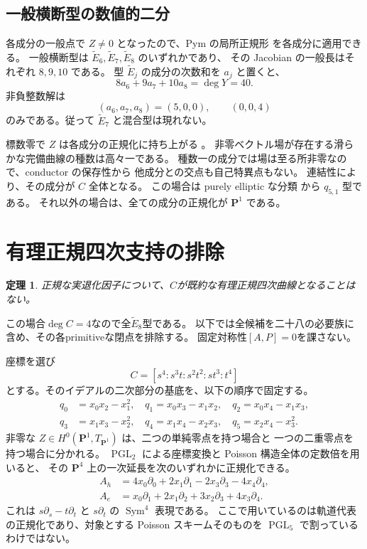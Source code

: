 \documentclass[11pt,a4paper]{ltjsarticle}
\newcommand{\PP}{\mathbf P}\renewcommand{\AA}{\mathbf A}
\newtheorem{theorem}{定理}[section]
\theoremstyle{remark}\newtheorem{remark}[theorem]{注意}
\begin{document}
\subsection{一般横断型の数値的二分}

各成分の一般点で $Z\ne0$ となったので、Pym の局所正規形
\cite[Theorem 4.5, Table 1]{PymElliptic}を各成分に適用できる。
一般横断型は $\widetilde E_6,\widetilde E_7,\widetilde E_8$ のいずれかであり、
その Jacobian の一般長はそれぞれ $8,9,10$ である。
型 $\widetilde E_j$ の成分の次数和を $a_j$ と置くと、
\[
8a_6+9a_7+10a_8=\deg Y=40.
\]
非負整数解は
\[
(a_6,a_7,a_8)=(5,0,0),\qquad (0,0,4)
\]
のみである。従って $\widetilde E_7$ と混合型は現れない。


標数零で $Z$ は各成分の正規化に持ち上がる \cite{Seidenberg}。
非零ベクトル場が存在する滑らかな完備曲線の種数は高々一である。
種数一の成分では場は至る所非零なので、conductor の保存性から
他成分との交点も自己特異点もない。
連結性により、その成分が $C$ 全体となる。
この場合は purely elliptic な分類 \cite[Theorem 1.3]{PymElliptic}から $q_{5,1}$ 型である。
それ以外の場合は、全ての成分の正規化が $\PP^1$ である。


\section{有理正規四次支持の排除}\label{sec:rnc4}
\begin{theorem}\label{thm:rnc4}
正規な実退化因子について、$C$が既約な有理正規四次曲線となることはない。
\end{theorem}
この場合$\deg C=4$なので全$\widetilde E_8$型である。
以下では全候補を二十八の必要族に含め、その各primitiveな閉点を排除する。
固定対称性$[A,P]=0$を課さない。


座標を選び
\[
 C=[s^4:s^3t:s^2t^2:st^3:t^4]
\]
とする。そのイデアルの二次部分の基底を、以下の順序で固定する。
\[
\begin{split}
 q_0&=x_0x_2-x_1^2,\quad q_1=x_0x_3-x_1x_2,\quad q_2=x_0x_4-x_1x_3,\\
 q_3&=x_1x_3-x_2^2,\quad q_4=x_1x_4-x_2x_3,\quad q_5=x_2x_4-x_3^2.
\end{split}
\]
非零な $Z\in H^0(\PP^1,T_{\PP^1})$ は、二つの単純零点を持つ場合と
一つの二重零点を持つ場合に分かれる。
$\operatorname{PGL}_2$ による座標変換と Poisson 構造全体の定数倍を用いると、
その $\PP^4$ 上の一次延長を次のいずれかに正規化できる。
\[
\begin{split}
 A_h&=4x_0\partial_0+2x_1\partial_1-2x_3\partial_3-4x_4\partial_4,\\
 A_e&=x_0\partial_1+2x_1\partial_2+3x_2\partial_3+4x_3\partial_4.
\end{split}
\]
これは $s\partial_s-t\partial_t$ と $s\partial_t$ の $\operatorname{Sym}^4$ 表現である。
ここで用いているのは軌道代表の正規化であり、対象とする Poisson スキームそのものを
$\operatorname{PGL}_5$ で割っているわけではない。
\end{document}

